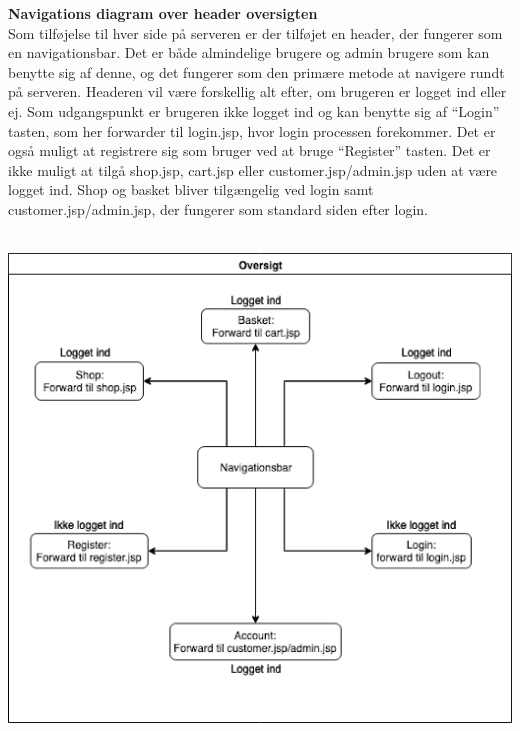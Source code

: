 \documentclass[11pt]{report}
\begin{document}
\noindent
\textbf{Navigations diagram over header oversigten}\\
Som tilføjelse til hver side på serveren er der tilføjet en header,
der fungerer som en navigationsbar. Det er både almindelige brugere og
admin brugere som kan benytte sig af denne, og det fungerer som den
primære metode at navigere rundt på serveren. Headeren vil være forskellig alt efter, om brugeren er logget ind eller ej. Som udgangspunkt er brugeren ikke logget ind og kan benytte sig af “Login” tasten, som her forwarder til login.jsp, hvor login processen forekommer. Det er også muligt at registrere sig som bruger ved at bruge “Register” tasten.
Det er ikke muligt at tilgå shop.jsp, cart.jsp eller
customer.jsp/admin.jsp uden at være logget ind. Shop og basket bliver
tilgængelig ved login samt customer.jsp/admin.jsp, der fungerer som
standard siden efter login.\\\\
\begin{center}
\includegraphics[width=15cm]{HeaderCupCake.png}
\end{center}
\end{document}
